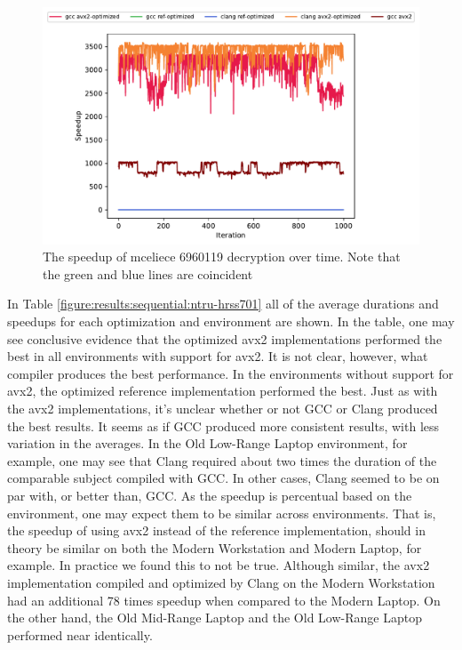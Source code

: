 \begin{figure}
    \centering
    \includegraphics[scale=0.75]{chapters/results/sequential/mceliece_6960119_decrypt_Cloud Provider 2.pdf}
    \caption{The speedup of \gls{mceliece} 6960119 decryption over time. Note that the green and blue lines are coincident}
    \label{figure:results:sequential:mceliece-decrpyt-cloud-provider-2}
\end{figure}

In Table \ref{figure:results:sequential:ntru-hrss701} all of the average durations and speedups for each optimization and environment are shown. In the table, one may see conclusive evidence that the optimized \gls{avx2} implementations performed the best in all environments with support for \gls{avx2}. It is not clear, however, what compiler produces the best performance. In the environments without support for \gls{avx2}, the optimized reference implementation performed the best. Just as with the \gls{avx2} implementations, it's unclear whether or not GCC or Clang produced the best results. It seems as if GCC produced more consistent results, with less variation in the averages. In the Old Low-Range Laptop environment, for example, one may see that Clang required about two times the duration of the comparable subject compiled with GCC. In other cases, Clang seemed to be on par with, or better than, GCC. As the speedup is percentual based on the environment, one may expect them to be similar across environments. That is, the speedup of using \gls{avx2} instead of the reference implementation, should in theory be similar on both the Modern Workstation and Modern Laptop, for example. In practice we found this to not be true. Although similar, the \gls{avx2} implementation compiled and optimized by Clang on the Modern Workstation had an additional 78 times speedup when compared to the Modern Laptop. On the other hand, the Old Mid-Range Laptop and the Old Low-Range Laptop performed near identically.

